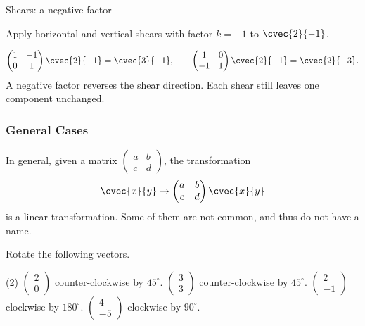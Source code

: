 \begin{frame}[t]{Shears: a negative factor}
\small
\begin{ex}
Apply horizontal and vertical shears with factor $k=-1$ to $\cvec{2}{-1}$.
\end{ex}
\begin{sol}
\[\begin{pmatrix}1&-1\\0&1\end{pmatrix}\cvec{2}{-1}=\cvec{3}{-1},\qquad\begin{pmatrix}1&0\\-1&1\end{pmatrix}\cvec{2}{-1}=\cvec{2}{-3}.\] A negative factor reverses the shear direction. Each shear still leaves one component unchanged.
\end{sol}
\end{frame}


\begin{frame}
\frametitle{General Cases}
In general, given a matrix $\begin{pmatrix} a & b \\ c & d \end{pmatrix}$, the transformation
\[ \cvec{x}{y} \to \begin{pmatrix} a & b \\ c & d \end{pmatrix} \cvec{x}{y} \]
is a linear transformation. Some of them are not common, and thus do not have a name.
\end{frame}

\begin{frame}
\begin{exercisebox}{}{}
Rotate the following vectors.
\begin{tasks}(2)
\task $\begin{pmatrix} 2 \\ 0 \end{pmatrix}$ counter-clockwise by $45^\circ$.
\task $\begin{pmatrix} 3 \\ 3 \end{pmatrix}$ counter-clockwise by $45^\circ$.
\task $\begin{pmatrix} 2 \\ -1 \end{pmatrix}$ clockwise by $180^\circ$.
\task $\begin{pmatrix} 4 \\ -5 \end{pmatrix}$ clockwise by $90^\circ$.
\end{tasks}
\end{exercisebox}
\end{frame}


